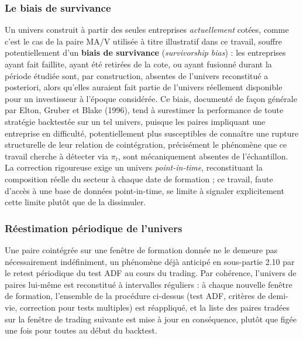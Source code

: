 \documentclass{article}
\begin{document}
\subsubsection*{Le biais de survivance}
Un univers construit à partir des seules entreprises \emph{actuellement} cotées, comme c'est le cas de la paire MA/V utilisée à titre illustratif dans ce travail, souffre potentiellement d'un \textbf{biais de survivance} (\emph{survivorship bias}) : les entreprises ayant fait faillite, ayant été retirées de la cote, ou ayant fusionné durant la période étudiée sont, par construction, absentes de l'univers reconstitué a posteriori, alors qu'elles auraient fait partie de l'univers réellement disponible pour un investisseur à l'époque considérée. Ce biais, documenté de façon générale par Elton, Gruber et Blake (1996), tend à surestimer la performance de toute stratégie backtestée sur un tel univers, puisque les paires impliquant une entreprise en difficulté, potentiellement plus susceptibles de connaître une rupture structurelle de leur relation de cointégration, précisément le phénomène que ce travail cherche à détecter via $\pi_t$, sont mécaniquement absentes de l'échantillon. La correction rigoureuse exige un univers \emph{point-in-time}, reconstituant la composition réelle du secteur à chaque date de formation ; ce travail, faute d'accès à une base de données point-in-time, se limite à signaler explicitement cette limite plutôt que de la dissimuler.
\subsubsection*{Réestimation périodique de l'univers}
Une paire cointégrée sur une fenêtre de formation donnée ne le demeure pas nécessairement indéfiniment, un phénomène déjà anticipé en sous-partie 2.10 par le retest périodique du test ADF au cours du trading. Par cohérence, l'univers de paires lui-même est reconstitué à intervalles réguliers : à chaque nouvelle fenêtre de formation, l'ensemble de la procédure ci-dessus (test ADF, critères de demi-vie, correction pour tests multiples) est réappliqué, et la liste des paires tradées sur la fenêtre de trading suivante est mise à jour en conséquence, plutôt que figée une fois pour toutes au début du backtest.
\end{document}
